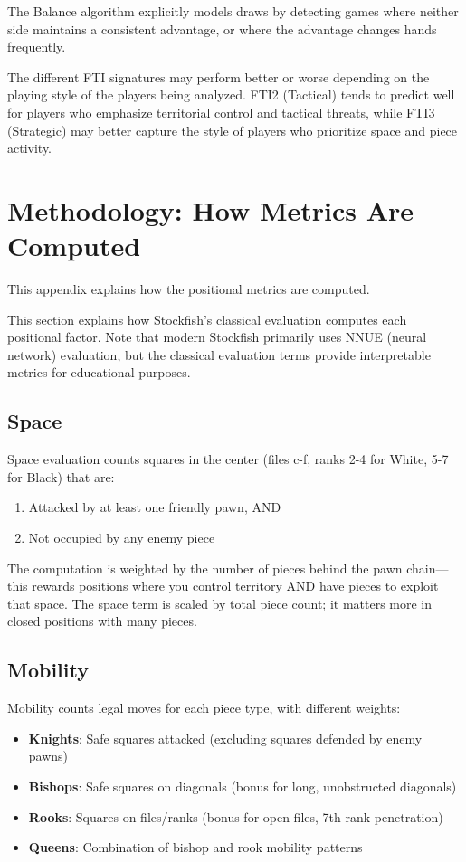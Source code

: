 \documentclass[11pt]{book}
\begin{document}
The Balance algorithm explicitly models draws by detecting games where neither side maintains a consistent advantage, or where the advantage changes hands frequently.

The different FTI signatures may perform better or worse depending on the playing style of the players being analyzed. FTI2 (Tactical) tends to predict well for players who emphasize territorial control and tactical threats, while FTI3 (Strategic) may better capture the style of players who prioritize space and piece activity.

\appendix
\chapter{Methodology: How Metrics Are Computed}

This appendix explains how the positional metrics are computed.


This section explains how Stockfish's classical evaluation computes each positional factor. Note that modern Stockfish primarily uses NNUE (neural network) evaluation, but the classical evaluation terms provide interpretable metrics for educational purposes.

\section{Space}

Space evaluation counts squares in the center (files c-f, ranks 2-4 for White, 5-7 for Black) that are:
\begin{enumerate}
\item Attacked by at least one friendly pawn, AND
\item Not occupied by any enemy piece
\end{enumerate}

The computation is weighted by the number of pieces behind the pawn chain---this rewards positions where you control territory AND have pieces to exploit that space. The space term is scaled by total piece count; it matters more in closed positions with many pieces.

\section{Mobility}

Mobility counts legal moves for each piece type, with different weights:
\begin{itemize}
\item \textbf{Knights}: Safe squares attacked (excluding squares defended by enemy pawns)
\item \textbf{Bishops}: Safe squares on diagonals (bonus for long, unobstructed diagonals)
\item \textbf{Rooks}: Squares on files/ranks (bonus for open files, 7th rank penetration)
\item \textbf{Queens}: Combination of bishop and rook mobility patterns
\end{itemize}
\end{document}

